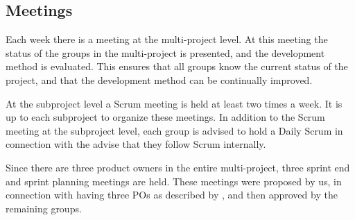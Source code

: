 
\subsection{Meetings}
Each week there is a meeting at the multi-project level. At this meeting the status of the groups in the multi-project is presented, and the development method is evaluated. This ensures that all groups know the current status of the project, and that the development method can be continually improved.

At the subproject level a Scrum meeting is held at least two times a week. It is up to each subproject to organize these meetings. In addition to the Scrum meeting at the subproject level, each group is advised to hold a Daily Scrum in connection with the advise that they follow Scrum internally.

Since there are three product owners in the entire multi-project, three sprint end and sprint planning meetings are held. These meetings were proposed by us, in connection with having three POs as described by \textcite{bird_davies_2007}, and then approved by the remaining groups.

